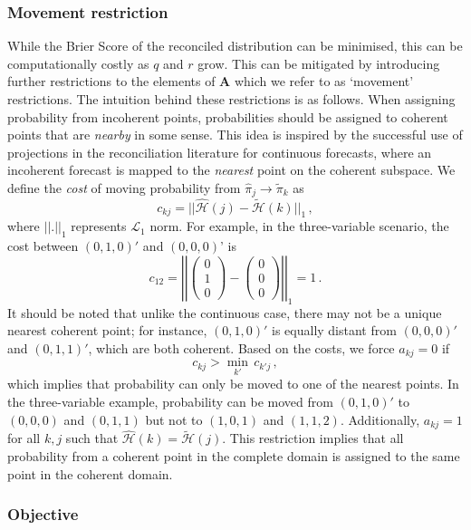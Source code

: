 \documentclass[a4paper,review,12pt,authoryear]{elsarticle}
\theoremstyle{definition}
\begin{document}
    \subsubsection*{\textbf{Movement restriction}}
    While the Brier Score of the reconciled distribution can be minimised, this can be computationally costly as $q$ and $r$ grow. This can be mitigated by introducing further restrictions to the elements of $\mathbf{A}$ which we refer to as `movement' restrictions.  The intuition behind these restrictions is as follows. When assigning probability from incoherent points, probabilities should be assigned to coherent points that are \emph{nearby} in some sense. This idea is inspired by the successful use of projections in the reconciliation literature for continuous forecasts, where an incoherent forecast is mapped to the \emph{nearest} point on the coherent subspace. We define the \emph{cost} of moving probability from $\hat{\pi}_j\rightarrow\tilde{\pi}_k$ as
    \[
    c_{kj}=||\hat{\mathcal{H}}(j)-\tilde{\mathcal{H}}(k)||_1\,,
    \]
    where $||.||_1$ represents $\mathcal{L}_1$ norm. For example, in the three-variable scenario, the cost between $(0, 1, 0)'$ and $(0, 0, 0)$' is
    \[
    c_{12}=\left|\left|\begin{pmatrix}0\\1\\0\end{pmatrix}-\begin{pmatrix}0\\0\\0\end{pmatrix}\right|\right|_1=1\,.
    \]
    It should be noted that unlike the continuous case, there may not be a unique nearest coherent point; for instance, $(0,1,0)'$ is equally distant from $(0,0,0)'$ and $(0,1,1)'$, which are both coherent.
    Based on the costs, we force $a_{kj}=0$ if
    \[
      c_{kj}>\underset{k'}{\min}\,c_{k'j}\,,
    \]
    which implies that probability can only be moved to one of the nearest points. In the three-variable example, probability can be moved from $(0,1,0)'$ to $(0,0,0)$ and $(0,1,1)$ but not to $(1,0,1)$ and $(1,1,2)$.
    Additionally, $a_{kj}=1$ for all $k,j$ such that $\hat{\mathcal{H}}(k)=\tilde{\mathcal{H}}(j)$.
    This restriction implies that all probability from a coherent point in the complete domain is assigned to the same point in the coherent domain.



    \subsubsection*{\textbf{Objective}}
\end{document}
